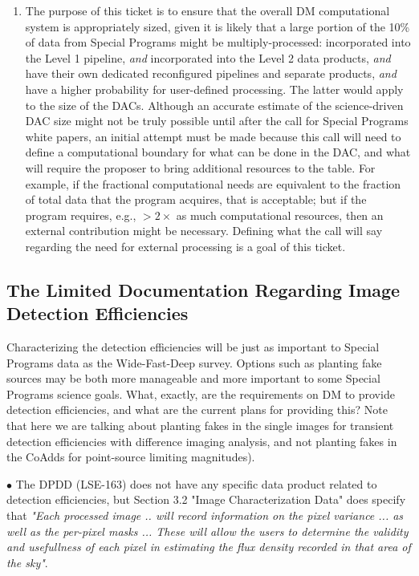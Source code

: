 \documentclass[DM,lsstdraft,toc]{lsstdoc}
\begin{document}
\begin{enumerate}[resume,topsep=-10pt,label= \textbf{Action \Roman*}] \item \label{Size-2} The purpose of this ticket is to ensure that the overall DM computational system is appropriately sized, given it is likely that a large portion of the 10\% of data from Special Programs might be multiply-processed: incorporated into the Level 1 pipeline, {\it and} incorporated into the Level 2 data products, {\it and} have their own dedicated reconfigured pipelines and separate products, {\it and} have a higher probability for user-defined processing. The latter would apply to the size of the DACs. Although an accurate estimate of the science-driven DAC size might not be truly possible until after the call for Special Programs white papers, an initial attempt must be made because this call will need to define a computational boundary for what can be done in the DAC, and what will require the proposer to bring additional resources to the table. For example, if the fractional computational needs are equivalent to the fraction of total data that the program acquires, that is acceptable; but if the program requires, e.g., $>2\times$ as much computational resources, then an external contribution might be necessary. Defining what the call will say regarding the need for external processing is a goal of this ticket. \end{enumerate}

\subsection{The Limited Documentation Regarding Image Detection Efficiencies}

Characterizing the detection efficiencies will be just as important to Special Programs data as the Wide-Fast-Deep survey. Options such as planting fake sources may be both more manageable and more important to some Special Programs science goals. What, exactly, are the requirements on DM to provide detection efficiencies, and what are the current plans for providing this? Note that here we are talking about planting fakes in the single images for transient detection efficiencies with difference imaging analysis, and not planting fakes in the CoAdds for point-source limiting magnitudes).

$\bullet$ The DPDD (LSE-163) does not have any specific data product related to detection efficiencies, but Section 3.2 "Image Characterization Data" does specify that {\it "Each processed image .. will record information on the pixel variance ... as well as the per-pixel masks ... These will allow the users to determine the validity and usefullness of each pixel in estimating the flux density recorded in that area of the sky"}.
\end{document}
